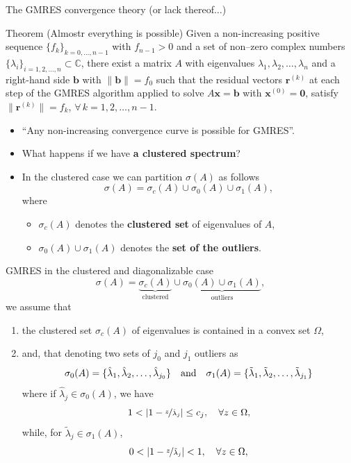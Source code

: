 \documentclass[aspectratio=169,xcolor=dvipsnames]{beamer}
\begin{document}
\begin{frame}{The GMRES convergence theory (or lack thereof$\ldots$)}

\begin{alertblock}{Theorem (Almostr everything is possible) \parencite{doi:10.1137/S0895479894275030}}
	Given a non-increasing positive sequence $\{f_k\}_{k=0,\ldots,n-1}$
	with $f_{n-1} > 0$ and a set of non--zero complex numbers
	$\{\lambda_i\}_{i=1,2,\ldots,n} \subset \mathbb{C}$, there exist a matrix $A$
	with eigenvalues $\lambda_1,\lambda_2,\ldots,\lambda_n$ and a
	right-hand side $\textbf{b}$ with $\|\textbf{b}\| = f_0$ such that the
	residual vectors $\textbf{r}^{(k)}$ at each step of the
	GMRES
	algorithm applied to solve $A\textbf{x} = \textbf{b}$ with
	$\textbf{x}^{(0)} = \textbf{0}$, satisfy $\|\textbf{r}^{(k)}\| = f_k$,
	$\forall \, k=1,2,\ldots,n-1$.
\end{alertblock}

\begin{itemize}
	\item[\faBomb] ``Any non-increasing convergence curve is possible for GMRES''.
	\item[\faQuestionCircle]<2-> What happens if we have \textbf{a clustered spectrum}?
	\item[\faLightbulb] In the clustered case we can partition $\sigma(A)$ as follows
	$$
	\sigma(A) = \sigma_c(A) \cup \sigma_{0}(A) \cup \sigma_{1}(A),
	$$
	where 
	\begin{itemize}
		\item $\sigma_c(A)$ denotes the \textbf{clustered set} of eigenvalues of $A$,
		\item $\sigma_{0}(A) \cup \sigma_{1}(A)$ denotes the \textbf{set of the
		outliers}.
	\end{itemize} 
\end{itemize}
\end{frame}

\begin{frame}{GMRES in the clustered and diagonalizable case}
\[
\sigma(A) = \underbrace{\sigma_c(A)}_{\text{clustered}} \cup \underbrace{\sigma_{0}(A) \cup \sigma_{1}(A)}_{\text{outliers}},
\]	
we assume that 
\begin{enumerate}
	\item the clustered set $\sigma_c(A)$ of eigenvalues is contained in a convex set $\Omega$,
	\item and, that denoting two sets of $j_0$ and $j_1$ outliers as
	\[
	\sigma_{0}(A) = \{ \hat{\lambda}_1, \hat{\lambda}_2, \ldots ,
	\hat{\lambda}_{j_0} \} \quad {\rm and} \quad \sigma_{1}(A) = \{
	\tilde{\lambda}_1, \tilde{\lambda}_2, \ldots , \tilde{\lambda}_{j_1} \}
	\]
	where if
	$\hat{\lambda}_j \in \sigma_{0}(A)$, we have
	$$
	1 < \left\lvert 1- \nicefrac{z}{\hat{\lambda}_j} \right\rvert \leq c_j, \quad
	\forall z \in \Omega,
	$$
	while, for $\tilde{\lambda}_j \in \sigma_{1}(A)$,
	$$
	0<\left\lvert 1- \nicefrac{z}{\tilde{\lambda}_j} \right\rvert < 1, \quad \forall
	z \in \Omega,
	$$
\end{enumerate}
\end{frame}
\end{document}
